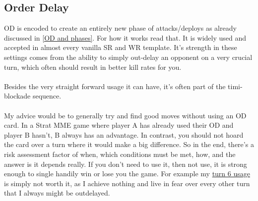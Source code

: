 \subsection{Order Delay}

OD is encoded to create an entirely new phase of attacks/deploys as already discussed in \ref{OD and phases}. For how it works read that. It is widely used and accepted in almost every vanilla SR and WR template. It's strength in these settings comes from the ability to simply out-delay an opponent on a very crucial turn, which often should result in better kill rates for you.
\\
\\
Besides the very straight forward usage it can have, it's often part of the timi-blockade sequence.
\\
\\
My advice would be to generally try and find good moves without using an OD card. In a Strat MME game where player A has already used their OD and player B hasn't, B always has an advantage. In contrast, you should not hoard the card over a turn where it would make a big difference. So in the end, there's a risk assessment factor of when, which conditions must be met, how, and the answer is it depends really. If you don't need to use it, then not use, it is strong enough to single handily win or lose you the game. For example my \href{https://www.warzone.com/MultiPlayer?GameID=38360784}{turn 6 usage} is simply not worth it, as I achieve nothing and live in fear over every other turn that I always might be outdelayed.